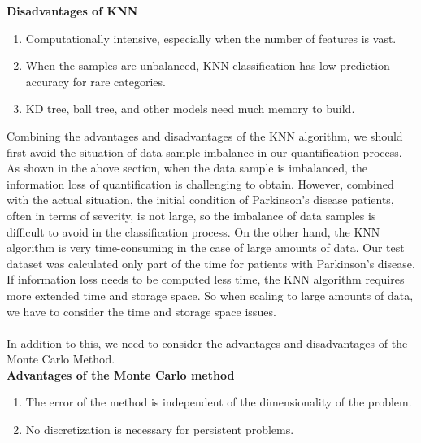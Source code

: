 \textbf{Disadvantages of KNN}
\begin{enumerate}
    \item  Computationally intensive, especially when the number of features is vast.
  \item  When the samples are unbalanced, KNN classification has low prediction accuracy for rare categories.
    \item  KD tree, ball tree, and other models need much memory to build.
\end{enumerate}
Combining the advantages and disadvantages of the KNN algorithm, we should first avoid the situation of data sample imbalance in our quantification process. As shown in the above section, when the data sample is imbalanced, the information loss of quantification is challenging to obtain. However, combined with the actual situation, the initial condition of Parkinson's disease patients, often in terms of severity, is not large, so the imbalance of data samples is difficult to avoid in the classification process. On the other hand, the KNN algorithm is very time-consuming in the case of large amounts of data. Our test dataset was calculated only part of the time for patients with Parkinson's disease. If information loss needs to be computed less time, the KNN algorithm requires more extended time and storage space. So when scaling to large amounts of data, we have to consider the time and storage space issues.
\\ \hspace*{\fill} \\

In addition to this, we need to consider the advantages and disadvantages of the Monte Carlo Method. \cite{earl2008monte,raychaudhuri2008introduction}\\
\textbf{Advantages of the Monte Carlo method}
\begin{enumerate}
    \item  The error of the method is independent of the dimensionality of the problem.
    \item  No discretization is necessary for persistent problems.
    
\end{enumerate}


